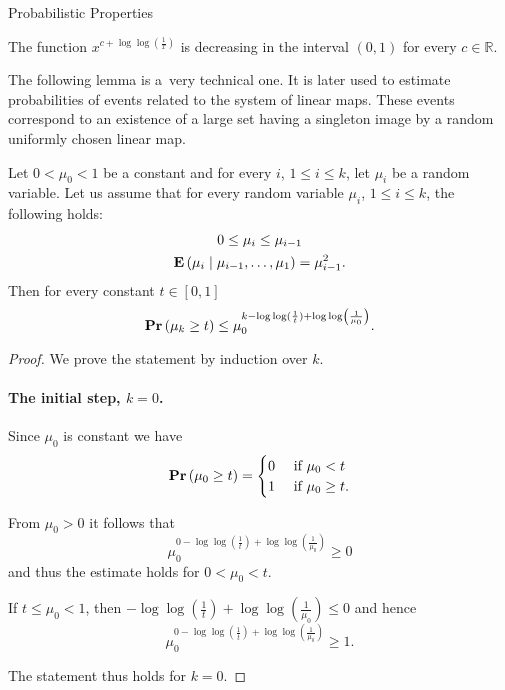 \begin{section}{Probabilistic Properties}
\begin{corollary}
\label{corollary-f0}
The function $x ^ {c + \log \log \left(\frac{1}{x}\right)}$ is decreasing in the interval $(0, 1)$ for every $c \in \mathbb{R}$.
\end{corollary}

The following lemma is a~very technical one. It is later used to estimate probabilities of events related to the system of linear maps. These events correspond to an existence of a large set having a singleton image by a random uniformly chosen linear map.
\begin{lemma}
\label{lemma-random-variable}
Let $0 < \mu_0 < 1$ be a constant and for every $i$, $1 \leq i \leq k$, let $\mu_i$ be a random variable. Let us assume that for every random variable $\mu_i$, $1 \leq i \leq k$, the following holds:
\begin{gather*}
0 \leq \mu_i \leq \mu_{i - 1} \\
\mathbf{E}\left( \mu_i \mid \mu_{i-1}, \dots, \mu_1 \right) = \mu_{i-1}^{2} \text{.}
\end{gather*}
Then for every constant $t \in \left[0, 1 \right]$ \[ \mathbf{Pr}\left(\mu_k \geq t\right) \leq \mu_0^{k - \log \log (\frac{1}{t}) + \log \log \left(\frac{1}{\mu_0}\right)} \text{.} \]
\end{lemma}
\begin{proof}
We prove the statement by induction over $k$. 

\paragraph*{The initial step, $k = 0$.}
Since $\mu_0$ is constant we have
\[
	\mathbf{Pr}\left(\mu_0 \geq t\right) = \begin{cases}
		0 & \text{ if } \mu_0 < t \\
		1 & \text{ if } \mu_0 \geq t \text{.} \\
	\end{cases}
\]

From $\mu_0 > 0$ it follows that
\[
	\mu_0^{0 - \log \log \left(\frac{1}{t}\right) + \log \log \left(\frac{1}{\mu_0}\right)} \geq 0
\]
and thus the estimate holds for $0 < \mu_0 < t$.

If $t \leq \mu_0 < 1$, then $-\log \log \left(\frac{1}{t}\right) + \log \log \left(\frac{1}{\mu_0}\right) \leq 0$ and hence
\[
	\mu_0^{0 - \log \log \left(\frac{1}{t}\right) + \log \log \left(\frac{1}{\mu_0}\right)} \geq 1 \text{.}
\]

The statement thus holds for $k = 0$.


\end{proof}
\end{section}
